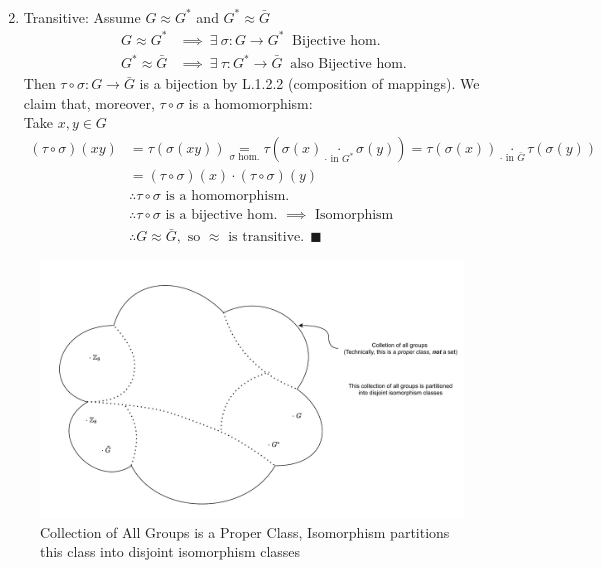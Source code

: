 \begin{proposition}
\begin{enumerate}
\begin{align}
    \end{align}
    \item Transitive: Assume $G\approx G^*$ and $G^*\approx \bar{G}$
    \begin{align}
        G\approx G^* &\implies \ \exists \ \sigma: G\rightarrow G^* \ \text{ Bijective hom.} \nonumber \\
        G^*\approx \bar{G} &\implies \ \exists \ \tau: G^* \rightarrow \bar{G} \ \text{ also Bijective hom.}\nonumber
    \end{align}
    Then $\tau \circ \sigma: G\rightarrow \bar{G} $ is a bijection by L.1.2.2 (composition of mappings). We claim that, moreover, $\tau \circ \sigma$ is a homomorphism:\\
    Take $x,y\in G$
    \begin{align}
        (\tau \circ \sigma) (xy)&=\tau(\sigma(xy))\underset{\sigma \text{ hom.}}{=}\tau(\sigma(x)\underset{\cdot \text{ in } G^*}{\cdot}\sigma(y)) = \tau(\sigma(x))\underset{\cdot \text{ in } \bar{G}}{\cdot} \tau(\sigma(y))\nonumber \\
        &=(\tau \circ \sigma)(x)\cdot (\tau\circ \sigma)(y) \nonumber \\
        &\therefore \tau\circ \sigma \text{ is a homomorphism.} \nonumber\\
        &\therefore \tau\circ \sigma \text{ is a bijective hom. }\implies \text{ Isomorphism} \nonumber \\
        &\therefore G\approx \bar{G}, \text{ so } \approx \text{ is transitive.} \ \ \blacksquare \nonumber
    \end{align}
\end{enumerate}
\end{proposition}

\begin{figure}
    \centering
    \includegraphics[width=\textwidth]{Figures/ClassofGroups_part (1).pdf}
    \caption{Collection of All Groups is a Proper Class, Isomorphism partitions this class into disjoint isomorphism classes}
    
    \label{fig:my_label}
\end{figure}
